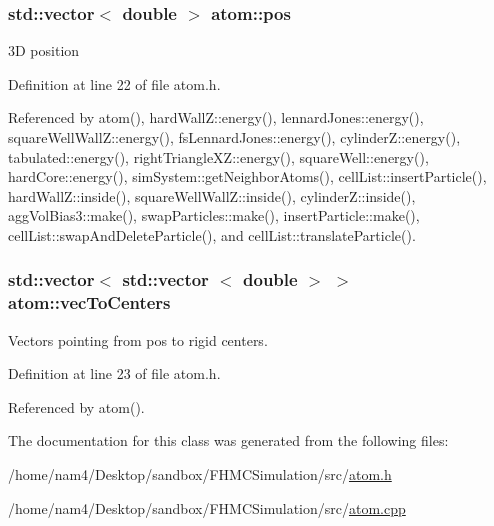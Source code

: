 \hypertarget{classatom_a3ae5f4880e7831d8b2c9fda72b4eb24a}{
\subsubsection[{pos}]{\setlength{\rightskip}{0pt plus 5cm}std\-::vector$<$ double $>$ atom\-::pos}}\label{classatom_a3ae5f4880e7831d8b2c9fda72b4eb24a}


3\-D position 



Definition at line 22 of file atom.\-h.



Referenced by atom(), hard\-Wall\-Z\-::energy(), lennard\-Jones\-::energy(), square\-Well\-Wall\-Z\-::energy(), fs\-Lennard\-Jones\-::energy(), cylinder\-Z\-::energy(), tabulated\-::energy(), right\-Triangle\-X\-Z\-::energy(), square\-Well\-::energy(), hard\-Core\-::energy(), sim\-System\-::get\-Neighbor\-Atoms(), cell\-List\-::insert\-Particle(), hard\-Wall\-Z\-::inside(), square\-Well\-Wall\-Z\-::inside(), cylinder\-Z\-::inside(), agg\-Vol\-Bias3\-::make(), swap\-Particles\-::make(), insert\-Particle\-::make(), cell\-List\-::swap\-And\-Delete\-Particle(), and cell\-List\-::translate\-Particle().

\hypertarget{classatom_a1376d52933b59a61ef76bf47f3f3732f}{
\subsubsection[{vec\-To\-Centers}]{\setlength{\rightskip}{0pt plus 5cm}std\-::vector$<$ std\-::vector $<$ double $>$ $>$ atom\-::vec\-To\-Centers}}\label{classatom_a1376d52933b59a61ef76bf47f3f3732f}


Vectors pointing from pos to rigid centers. 



Definition at line 23 of file atom.\-h.



Referenced by atom().



The documentation for this class was generated from the following files\-:\begin{DoxyCompactItemize}
\item 
/home/nam4/\-Desktop/sandbox/\-F\-H\-M\-C\-Simulation/src/\hyperlink{atom_8h}{atom.\-h}\item 
/home/nam4/\-Desktop/sandbox/\-F\-H\-M\-C\-Simulation/src/\hyperlink{atom_8cpp}{atom.\-cpp}\end{DoxyCompactItemize}
